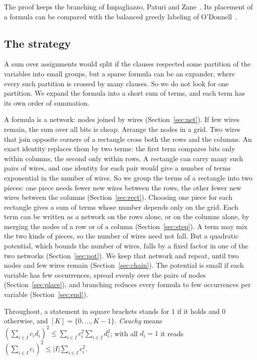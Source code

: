 \documentclass[11pt]{article}
\begin{document}
The proof keeps the branching of Impagliazzo, Paturi and Zane~\cite{IPZ01}. Its placement of a formula can be compared with the balanced greedy labeling of O'Donnell~\cite[Lemma~4.1]{OD26}.

\subsection*{The strategy}

A sum over assignments would split if the clauses respected some partition of the variables into small groups, but a sparse formula can be an expander, where every such partition is crossed by many clauses. So we do not look for one partition. We expand the formula into a short sum of terms, and each term has its own order of summation.

A formula is a network: nodes joined by wires (Section~\ref{sec:net}). If few wires remain, the sum over all bits is cheap. Arrange the nodes in a grid. Two wires that join opposite corners of a rectangle cross both the rows and the columns. An exact identity replaces them by two terms: the first term compares bits only within columns, the second only within rows. A rectangle can carry many such pairs of wires, and one identity for each pair would give a number of terms exponential in the number of wires. So we group the terms of a rectangle into two pieces: one piece needs fewer new wires between the rows, the other fewer new wires between the columns (Section~\ref{sec:rect}). Choosing one piece for each rectangle gives a sum of terms whose number depends only on the grid. Each term can be written as a network on the rows alone, or on the columns alone, by merging the nodes of a row or of a column (Section~\ref{sec:step}). A term may mix the two kinds of pieces, so the number of wires need not fall. But a quadratic potential, which bounds the number of wires, falls by a fixed factor in one of the two networks (Section~\ref{sec:pot}). We keep that network and repeat, until two nodes and few wires remain (Section~\ref{sec:chain}). The potential is small if each variable has few occurrences, spread evenly over the pairs of nodes (Section~\ref{sec:place}), and branching reduces every formula to few occurrences per variable (Section~\ref{sec:end}).

Throughout, a statement in square brackets stands for $1$ if it holds and $0$ otherwise, and $[K]=\{0,\dots,K-1\}$. \emph{Cauchy} means $(\sum_{i\in I}c_id_i)^2\le\sum_{i\in I}c_i^2\sum_{i\in I}d_i^2$; with all $d_i=1$ it reads $(\sum_{i\in I}c_i)^2\le|I|\sum_{i\in I}c_i^2$.
\end{document}

